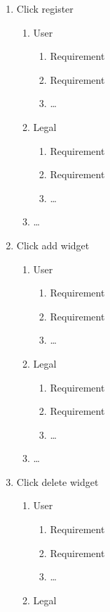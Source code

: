 \documentclass[]{article}
\begin{document}
\begin{enumerate}[{BE}1.]
\begin{enumerate}[{VP2}.1]
		\item \dots
	\end{enumerate}
	\item Click register
	\begin{enumerate}[{VP1}.1]
		\item User
			\begin{enumerate}
				\item Requirement
				\item Requirement
				\item \dots
			\end{enumerate}
		\item Legal
			\begin{enumerate}
				\item Requirement
				\item Requirement
				\item \dots
			\end{enumerate}
		\item \dots
	\end{enumerate}
	\item Click add widget
	\begin{enumerate}[{VP1}.1]
		\item User
			\begin{enumerate}
				\item Requirement
				\item Requirement
				\item \dots
			\end{enumerate}
		\item Legal
			\begin{enumerate}
				\item Requirement
				\item Requirement
				\item \dots
			\end{enumerate}
		\item \dots
	\end{enumerate}
	\item Click delete widget
	\begin{enumerate}[{VP1}.1]
		\item User
			\begin{enumerate}
				\item Requirement
				\item Requirement
				\item \dots
			\end{enumerate}
		\item Legal
			\begin{enumerate}

\end{enumerate}
\end{enumerate}
\end{enumerate}
\end{document}

